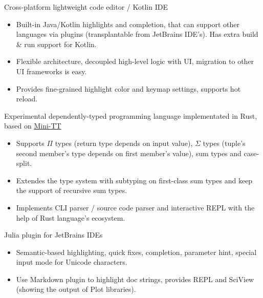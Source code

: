 \documentclass{resume}
\begin{document}
Cross-platform lightweight code editor / Kotlin IDE
\begin{itemize}
  \item Built-in Java/Kotlin highlights and completion, that can support other languages
    via plugins (transplantable from JetBrains IDE's).
    Has extra build \& run support for Kotlin.
  \item Flexible architecture, decoupled high-level logic with UI, migration to other UI frameworks is easy.
  \item Provides fine-grained highlight color and keymap settings, supports hot reload.
\end{itemize}

Experimental dependently-typed programming language implementated in Rust, based on \href{http://www.cse.chalmers.se/~bengt/papers/GKminiTT.pdf} {Mini-TT}
\begin{itemize}
  \item Supports $\Pi$ types (return type depends on input value), $\Sigma$ types (tuple's second member's type depends on first member's value), sum types and case-split.
  \item Extendes the type system with subtyping on first-class sum types and keep the support of recursive sum types.
  \item Implements CLI parser / source code parser and interactive REPL with the help of Rust language's ecosystem.
\end{itemize}


Julia plugin for JetBrains IDEs
\begin{itemize}
  \item Semantic-based highlighting, quick fixes, completion, parameter hint, special input mode for Unicode characters.
  \item Use Markdown plugin to highlight doc strings, provides REPL and SciView (showing the output of Plot libraries).
\end{itemize}
\end{document}

